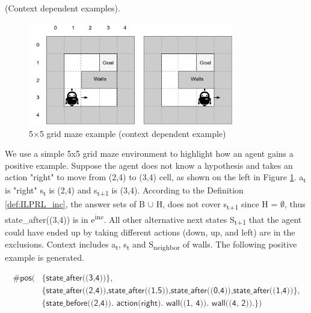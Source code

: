 \begin{examp} \normalfont (Context dependent examples).

\begin{figure}[!htb]
\centering
\includegraphics[width=0.8\textwidth]{./figures/pipeline_example1}
\caption{5$\times$5 grid maze example (context dependent example)}
\label{example_pos_example}
\end{figure}

We use a simple 5x5 grid maze environment to highlight how an agent gains a positive example.
Suppose the agent does not know a hypothesis and takes an action "right" to move from (2,4) to (3,4) cell, as shown on the left in Figure \ref{example_pos_example}.
a\textsubscript{t} is "right" s\textsubscript{t} is (2,4) and s\textsubscript{t+1} is (3,4).
According to the Definition \ref{def:ILPRL_inc}, the answer sets of B $\cup$ H, does not cover s\textsubscript{t+1} since H = $\emptyset$, thus \textsf{state\_after((3,4))} is in e\textsuperscript{inc}.
All other alternative next states S\textsubscript{t+1} that the agent could have ended up by taking different actions
(down, up, and left) are in the exclusions.
Context includes a\textsubscript{t}, s\textsubscript{t} and S\textsubscript{neighbor} of walls.
The following positive example is generated.

\begin{equation}
\begin{split}
    \textsf{\#pos(} & \textsf{\{state\_after((3,4))\},}\\
                    & \textsf{\{state\_after((2,4)),state\_after((1,5)),state\_after((0,4)),state\_after((1,4))\},} \\
    & \textsf{\{state\_before((2,4)). action(right). wall((1, 4)). wall((4, 2)).\})}
\end{split}
\end{equation}


\end{examp}
